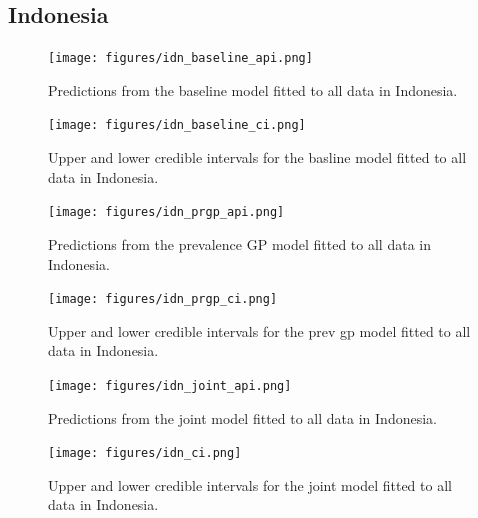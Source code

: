\documentclass[10pt,a4]{article}
\begin{document}
\clearpage
\subsection{Indonesia}


\begin{figure}[h!]
\centering

\texttt{[image: figures/idn\_baseline\_api.png]}

\caption{Predictions from the baseline model fitted to all data in Indonesia.}
\label{baselineidn}
\end{figure}

\begin{figure}[h!]
\centering

\texttt{[image: figures/idn\_baseline\_ci.png]}

\caption{Upper and lower credible intervals for the basline model fitted to all data in Indonesia.}
\label{basemdgci}
\end{figure}



\begin{figure}[h!]
\centering

\texttt{[image: figures/idn\_prgp\_api.png]}

\caption{Predictions from the prevalence GP model fitted to all data in Indonesia.}
\label{gpidn}
\end{figure}


\begin{figure}[h!]
\centering

\texttt{[image: figures/idn\_prgp\_ci.png]}

\caption{Upper and lower credible intervals for the prev gp model fitted to all data in Indonesia.}
\label{prgpmdgci}
\end{figure}


\begin{figure}[h!]
\centering

\texttt{[image: figures/idn\_joint\_api.png]}

\caption{Predictions from the joint model fitted to all data in Indonesia.}
\label{jointidn}
\end{figure}



\begin{figure}[h!]
\centering

\texttt{[image: figures/idn\_ci.png]}

\caption{Upper and lower credible intervals for the joint model fitted to all data in Indonesia.}
\label{jointmdgci}
\end{figure}
\end{document}
